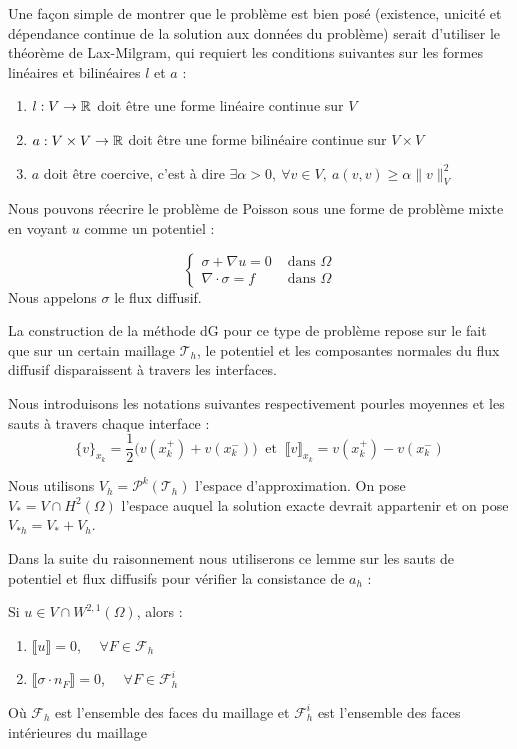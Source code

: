 \vspace{1em}
Une façon simple de montrer que le problème est bien posé (existence, unicité et dépendance continue de la solution aux données du problème) serait d'utiliser le théorème de Lax-Milgram, qui 
requiert les conditions suivantes sur les formes linéaires et bilinéaires $l$ et $a$ :
\begin{enumerate}
    \item $l : V \to \mathbb{R}$ doit être une forme linéaire continue sur $V$ 
    \item $a : V \times V \to \mathbb{R} $ doit être une forme bilinéaire continue sur $V \times V$
    \item $a$ doit être coercive, c'est à dire $\exists \alpha > 0, \ \forall v \in V, \ a(v,v) \geq \alpha \| v \|_{V}^2$
\end{enumerate}

Nous pouvons réecrire le problème de Poisson sous une forme de problème mixte en voyant $u$ comme un potentiel :

$$\begin{cases}
    \sigma + \nabla u = 0 & \text{ dans } \Omega \\
    \nabla \cdot \sigma = f & \text{ dans } \Omega
\end{cases}$$
Nous appelons $\sigma$ le flux diffusif.

La construction de la méthode dG pour ce type de problème repose sur le fait que sur un certain maillage $\mathcal{T}_h$, 
le potentiel et les composantes normales du flux diffusif disparaissent à travers les interfaces. 

\vspace{1em}

Nous introduisons les notations suivantes respectivement pourles moyennes et les sauts à travers chaque interface :
$$\{v\}_{x_k} = \frac{1}{2}\Big(v(x_k^+) + v(x_k^-)\Big) \ \text{ et } \ \llbracket v \rrbracket_{x_k} = v(x_k^+) - v(x_k^-)$$

Nous utilisons $V_h = \mathcal{P}^k(\mathcal{T}_h)$ l'espace d'approximation. 
On pose $V_{*} = V \cap H^2(\Omega)$ l'espace auquel la solution exacte devrait appartenir \cite{dG} et on pose $V_{*h} = V_{*} + V_h$.

Dans la suite du raisonnement nous utiliserons ce lemme sur les sauts de potentiel et flux diffusifs pour vérifier la consistance de $a_h$ :
\begin{lemmabox}
\begin{lemma}
    Si $u\in V \cap W^{2,1}(\Omega)$, alors :
    \begin{enumerate}
        \item $\llbracket u \rrbracket = 0$, $\quad \forall F \in \mathcal{F}_h$
        \item $\llbracket \sigma \cdot n_F \rrbracket = 0$, $\quad \forall F \in \mathcal{F}_h^i$
    \end{enumerate}
\end{lemma}
\end{lemmabox}
Où $\mathcal{F}_h$ est l'ensemble des faces du maillage et $\mathcal{F}_h^i$ est l'ensemble des faces intérieures du maillage

